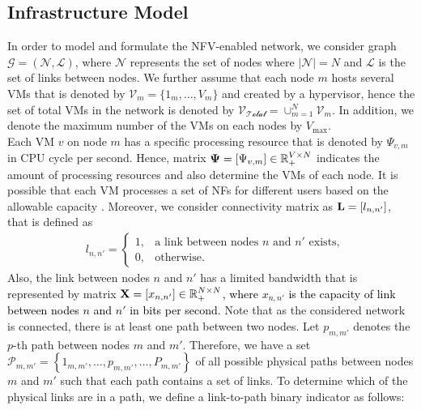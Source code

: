 \documentclass[20pt,twocolumn]{IEEEtran}
\begin{document}
	\subsection{{Infrastructure Model}}
	In order to model and formulate the NFV-enabled network, we  consider graph  $\mathcal{G}=(\mathcal{N},\mathcal{L})$, where $\mathcal {N}$ represents the set of  nodes where $\left| \mathcal{N}\right|=N $ and $\mathcal{L}$ is the set of links between nodes. 
 We further assume that each node $m$  hosts several  VMs  that is denoted by $\mathcal{V}_{m}=\{1_m,\dots,V_m\}$ and created by a hypervisor, hence the set of total VMs  in the network is denoted by $\mathcal{V_\text{Total}}=\cup_{m=1}^{N}\mathcal{V}_m$.
 In addition, we denote the  maximum number of the VMs on each nodes by $V_\text{max}$.
	\\ \indent
Each VM $v$ on node $m$ has a specific processing resource  that is denoted by $\Psi_{v,m}$ in CPU cycle per second. Hence, matrix $\boldsymbol{\Psi}=[\Psi_{v,m}]\in \Bbb{R}_{+}^{V\times N}$ %
indicates the amount of processing resources and also determine the VMs of each node.  It is possible that each VM processes a set of NFs for different users based on the allowable capacity \cite{gholipoor2020e2e}.
 Moreover,  we consider connectivity matrix as $\bold{L}=\left[  l_{n,n'}\right] $, that is defined as
	\begin{equation}%
	\begin{split}
	&l_{n,n'}= \begin{cases}
	1, & \text{a link between nodes $n$ and $n'$ exists},\\
	0, & \text{otherwise}.
	\end{cases}
	\end{split} 
	\end{equation}
Also, the link between nodes $n$ and $n'$ has a limited bandwidth that is represented by matrix \textcolor{black}{$\bold{X}= [x_{n,n'}]\in{\Bbb{R}}_{+}^{N\times N}$, where $x_{n,n'}$ is the capacity of link  between nodes ${n}$ and ${n'}$ in bits per second.}	Note that as the considered network is connected, there is at least one path between two nodes. Let $p_{m,m'}$ denotes the
$p$-th path between nodes $m$ and $m'$. Therefore,  we have a set $\mathcal{P}_{m,m'}=\left\{1_{m,m'},\dots,p_{m,m'},\dots,P_{m,m'}\right\}$ of all possible physical paths between nodes $m$ and $m'$ such that each path  contains a set of links. To determine which of  the physical links are in a path, we define a link-to-path binary indicator as follows:
\end{document}
